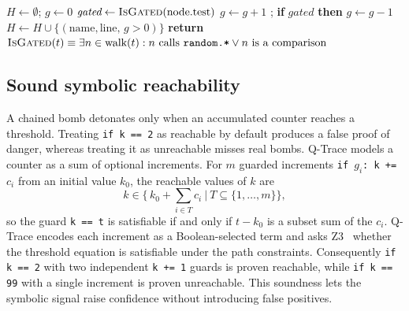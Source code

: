 \documentclass[runningheads]{llncs}
\begin{document}
\begin{algorithm}[t]
\caption{Sink-aware AST scan with branch gating.}
\label{alg:sink}
\begin{algorithmic}[1]
\State $H \gets \emptyset$;\; $g \gets 0$ 
     \State $\textit{gated} \gets \Call{IsGated}{\text{node.test}}$
     \; $g \gets g+1$\; \EndIf
     \State {};\; \textbf{if } $\textit{gated}$ \textbf{ then } $g \gets g-1$
     \State {}
     \State $H \gets H \cup \{(\text{name},\text{line},\, g>0)\}$
  \Else\; 
  \EndIf
\EndFunction
\State \textbf{return} $\Call{IsGated}{t} \equiv \exists n \in \text{walk}(t):
   n \text{ calls } \texttt{random.*} \vee n \text{ is a comparison}$
\end{algorithmic}
\end{algorithm}

\subsection{Sound symbolic reachability}\label{sec:symbolic}
A chained bomb detonates only when an accumulated counter reaches a threshold.
Treating \texttt{if k == 2} as reachable by default produces a false proof of
danger, whereas treating it as unreachable misses real bombs. Q-Trace models a
counter as a sum of optional increments. For $m$ guarded increments
\texttt{if $g_i$: k += $c_i$} from an initial value $k_0$, the reachable values of
$k$ are
\begin{equation}
k \in \Big\{\, k_0 + \textstyle\sum_{i\in T} c_i \ \Big|\ T \subseteq \{1,\dots,m\} \Big\},
\end{equation}
so the guard \texttt{k == t} is satisfiable if and only if $t - k_0$ is a subset
sum of the $c_i$. Q-Trace encodes each increment as a Boolean-selected term and
asks Z3~\cite{z3} whether the threshold equation is satisfiable under the path
constraints. Consequently \texttt{if k == 2} with two independent \texttt{k += 1}
guards is proven reachable, while \texttt{if k == 99} with a single increment is
proven unreachable. This soundness lets the symbolic signal raise confidence
without introducing false positives.
\end{document}
